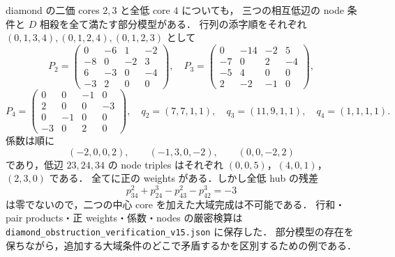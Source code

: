 diamond の二価 cores $2,3$ と全低 core $4$ についても，
三つの相互低辺の node 条件と $D$ 相殺を全て満たす部分模型がある．
行列の添字順をそれぞれ $(0,1,3,4),(0,1,2,4),(0,1,2,3)$ として
\[
 P_2=\begin{pmatrix}0&-6&1&-2\\-8&0&-2&3\\6&-3&0&-4\\-3&2&0&0\end{pmatrix},\quad
 P_3=\begin{pmatrix}0&-14&-2&5\\-7&0&2&-4\\-5&4&0&0\\2&-2&-1&0\end{pmatrix},
\]
\[
 P_4=\begin{pmatrix}0&0&-1&0\\2&0&0&-3\\0&-1&0&0\\-3&0&2&0\end{pmatrix},
 \quad q_2=(7,7,1,1),\quad q_3=(11,9,1,1),\quad q_4=(1,1,1,1).
\]
係数は順に
\[
 (-2,0,0,2),\qquad(-1,3,0,-2),\qquad(0,0,-2,2)
\]
であり，低辺 $23,24,34$ の node triples はそれぞれ
$(0,0,5)$，$(4,0,1)$，$(2,3,0)$ である．
全てに正の weights がある．しかし全低 hub の残差
\[
 p^2_{34}+p^3_{24}-p^2_{43}-p^3_{42}=-3
\]
は零でないので，二つの中心 core を加えた大域完成は不可能である．
行和・pair products・正 weights・係数・nodes の厳密検算は
\nolinkurl{diamond_obstruction_verification_v15.json} に保存した．
部分模型の存在を保ちながら，追加する大域条件のどこで矛盾するかを区別するための例である．
